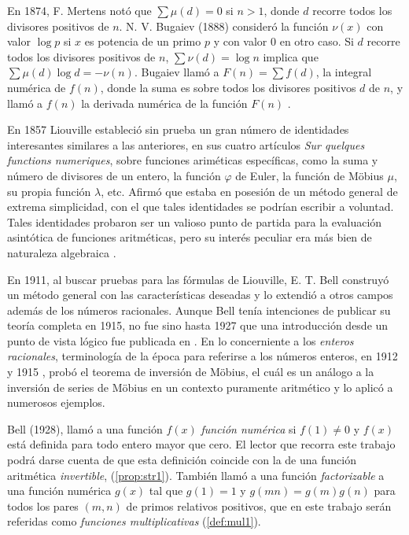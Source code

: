 En 1874, F. Mertens notó que $\sum \mu(d) = 0$ si $n>1$, donde $d$ recorre todos los divisores positivos de $n$.
N. V. Bugaiev (1888) consideró la función $\nu(x)$ con valor $\log p$ si $x$ es potencia de un primo $p$ y con valor 0 en otro caso. Si $d$ recorre todos los divisores positivos de $n$, $\sum \nu(d) = \log n$ implica que $\sum \mu(d) \log d = -\nu(n)$. Bugaiev llamó a $F(n) = \sum f(d)$, la integral numérica de $f(n)$, donde la suma es sobre todos los divisores positivos $d$ de $n$, y llamó a $f(n)$ la derivada numérica de la función $F(n)$ \cite{Di1}.
\newpage
\thispagestyle{easter3}

En 1857 Liouville estableció sin prueba un gran número de identidades interesantes similares a las anteriores, en sus cuatro artículos \emph{Sur quelques functions numeriques}, sobre funciones ariméticas específicas, como la suma y número de divisores de un entero, la función $\varphi$ de Euler, la función de Möbius $\mu$, su propia función $\lambda$, etc. Afirmó que estaba en posesión de un método general de extrema simplicidad, con el que tales identidades se podrían escribir a voluntad. Tales identidades probaron ser un valioso punto de partida para la evaluación asintótica de funciones aritméticas, pero su interés peculiar era más bien de naturaleza algebraica \cite{Bell1}. 
\bigskip

En 1911, al buscar pruebas para las fórmulas de Liouville, E. T. Bell construyó un método general con las características deseadas y lo extendió a otros campos además de los números racionales. Aunque Bell tenía intenciones de publicar su teoría completa en 1915, no fue sino hasta 1927 que una introducción desde un punto de vista lógico fue publicada en \cite{Bell2}. En lo concerniente a los \textit{enteros racionales}, terminología de la época para referirse a los números enteros, en 1912 y 1915 \cite{Bell1}, probó el teorema de inversión de Möbius, el cuál es un análogo a la inversión de series de Möbius en un contexto puramente aritmético y lo aplicó a numerosos ejemplos.
\bigskip

Bell (1928), llamó a una función $f(x)$ \emph{función numérica} si $f(1) \ne 0$ y $f(x)$ está definida para todo entero mayor que cero. El lector que recorra este trabajo podrá darse cuenta de que esta definición coincide con la de una función aritmética \emph{invertible}, (\cref{prop:str1}). También llamó a una función \emph{factorizable} a una función numérica $g(x)$ tal que $g(1)=1$ y $g(m n)=g(m)g(n)$ para todos los pares $(m,n)$ de primos relativos positivos, que en este trabajo serán referidas como \emph{funciones multiplicativas} (\cref{def:mul1}).
\bigskip

